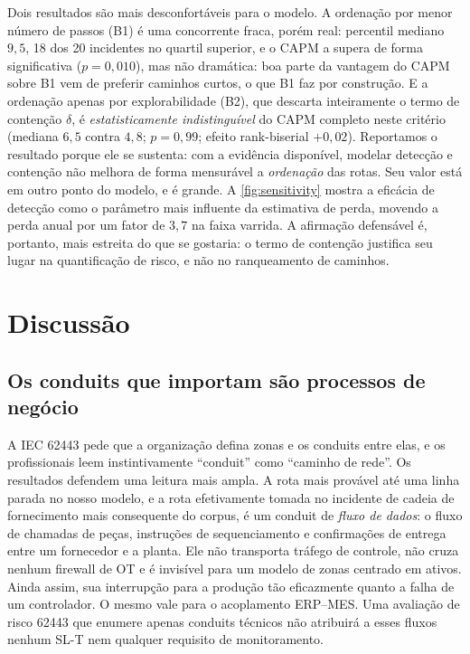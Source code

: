 Dois resultados são mais desconfortáveis para o modelo. A ordenação por menor
número de passos (B1) é uma concorrente fraca, porém real: percentil mediano
$9{,}5$, 18 dos 20 incidentes no quartil superior, e o CAPM a supera de forma
significativa ($p = 0{,}010$), mas não dramática: boa parte da vantagem do CAPM sobre B1 vem de preferir
caminhos curtos, o que B1 faz por construção. E a
ordenação apenas por explorabilidade (B2), que descarta inteiramente o termo de
contenção $\delta$, é \emph{estatisticamente indistinguível} do CAPM completo
neste critério (mediana $6{,}5$ contra $4{,}8$; $p = 0{,}99$; efeito
rank-biserial $+0{,}02$). Reportamos o resultado porque ele se sustenta: com a evidência disponível, modelar detecção e contenção não melhora de forma mensurável a
\emph{ordenação} das rotas. Seu valor está em outro ponto do modelo, e é grande. A \cref{fig:sensitivity} mostra a eficácia de detecção como o parâmetro mais
influente da estimativa de perda, movendo a perda anual por um fator de $3{,}7$
na faixa varrida. A afirmação defensável é, portanto, mais estreita do que se
gostaria: o termo de contenção justifica seu lugar na quantificação de risco, e
não no ranqueamento de caminhos.




\section{Discussão}
\label{sec:discussao}

\subsection{Os conduits que importam são processos de negócio}

A IEC 62443 pede que a organização defina zonas e os conduits entre elas, e os
profissionais leem instintivamente ``conduit'' como ``caminho de rede''. Os
resultados defendem uma leitura mais ampla. A rota mais provável até uma linha
parada no nosso modelo, e a rota efetivamente tomada no incidente de cadeia de
fornecimento mais consequente do corpus, é um conduit de \emph{fluxo de dados}:
o fluxo de chamadas de peças, instruções de sequenciamento e confirmações de
entrega entre um fornecedor e a planta. Ele não transporta tráfego de controle,
não cruza nenhum firewall de OT e é invisível para um modelo de zonas centrado em ativos. Ainda assim, sua
interrupção para a produção tão eficazmente quanto a falha de um controlador. O mesmo vale para o acoplamento ERP--MES. Uma
avaliação de risco 62443 que enumere apenas conduits técnicos não atribuirá a
esses fluxos nenhum SL-T nem qualquer requisito de monitoramento.

